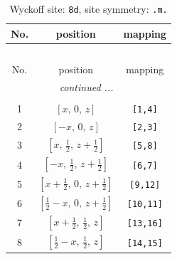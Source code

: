 \documentclass[fleqn,8pt]{jsarticle}
\begin{document}
\begin{longtable}{ccc}
\caption{Wyckoff site: {\tt 8d}, site symmetry: {\tt .m.}}
 \\
 \hline \hline
No. & position & mapping \\ \hline \endfirsthead

\multicolumn{2}{l}{\tablename\ \thetable{}} \\
 \hline \hline
No. & position & mapping \\ \hline \endhead

 \hline \hline
\multicolumn{2}{r}{\footnotesize\it continued ...} \\ \endfoot

 \hline \hline
\multicolumn{2}{r}{} \\ \endlastfoot

1 & $\left[ x,\, 0,\, z \right]$ & {\tt [1,4]} \\ \hline
2 & $\left[ - x,\, 0,\, z \right]$ & {\tt [2,3]} \\ \hline
3 & $\left[ x,\, \frac{1}{2},\, z + \frac{1}{2} \right]$ & {\tt [5,8]} \\ \hline
4 & $\left[ - x,\, \frac{1}{2},\, z + \frac{1}{2} \right]$ & {\tt [6,7]} \\ \hline
5 & $\left[ x + \frac{1}{2},\, 0,\, z + \frac{1}{2} \right]$ & {\tt [9,12]} \\ \hline
6 & $\left[ \frac{1}{2} - x,\, 0,\, z + \frac{1}{2} \right]$ & {\tt [10,11]} \\ \hline
7 & $\left[ x + \frac{1}{2},\, \frac{1}{2},\, z \right]$ & {\tt [13,16]} \\ \hline
8 & $\left[ \frac{1}{2} - x,\, \frac{1}{2},\, z \right]$ & {\tt [14,15]} \\
\end{longtable}
\renewcommand{\arraystretch}{1.2}
\end{document}
